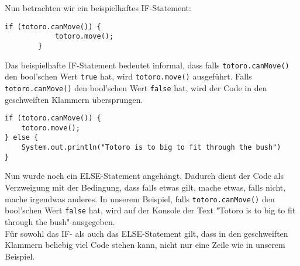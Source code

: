 \begin{Infobox}[IF-Verzweigung]
    Nun betrachten wir ein beispielhaftes IF-Statement:

    \begin{lstlisting}[breaklines=true, numbers=none]
        if (totoro.canMove()) {
            totoro.move();
        } 
    \end{lstlisting}

    Das beispielhafte IF-Statement bedeutet informal, dass falls \lstinline{totoro.canMove()} den bool'schen Wert \lstinline{true} hat, wird \lstinline{totoro.move()} ausgeführt. Falls \lstinline{totoro.canMove()} den bool'schen Wert \lstinline{false} hat, wird der Code in den geschweiften Klammern übersprungen.

    \begin{lstlisting}[breaklines=true, numbers=none]
if (totoro.canMove()) {
    totoro.move();
} else {
    System.out.println("Totoro is to big to fit through the bush")
}
    \end{lstlisting}

    Nun wurde noch ein ELSE-Statement angehängt. Dadurch dient der Code als Verzweigung mit der Bedingung, dass falls etwas gilt, mache etwas, falls nicht, mache irgendwas anderes. In unserem Beispiel, falls \lstinline{totoro.canMove()} den bool'schen Wert \lstinline{false} hat, wird auf der Konsole der Text "Totoro is to big to fit through the bush" ausgegeben.\\

Für sowohl das IF- als auch das ELSE-Statement gilt, dass in den geschweiften Klammern beliebig viel Code stehen kann, nicht nur eine Zeile wie in unserem Beispiel.
\end{Infobox}


